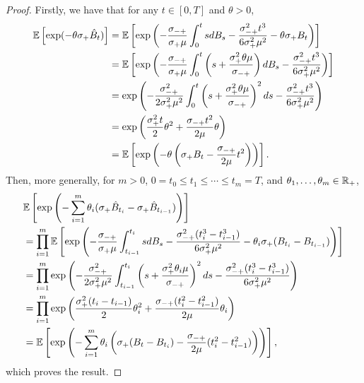  \begin{proof}
 Firstly, we have that for any $t\in [0,T]$ and $\theta>0$,
 \begin{align*} {\mathbb E}\left[\exp(-\theta \sigma_+ \hat{B}_t)\right] &= {\mathbb E} \left[ \exp\left(-\frac{\sigma_{-+}}{\sigma_+ \mu}\int_0^t s dB_s-\frac{\sigma_{-+}^2 t^3}{6\sigma_+^2\mu^2}-\theta\sigma_+ B_t  \right)\right]\\
 &={\mathbb E}\left[\exp \left( -\frac{\sigma_{-+}}{\sigma_+ \mu}\int_0^t \left(s+\frac{\sigma_+^2\theta \mu}{\sigma_{-+}}\right) dB_s -\frac{\sigma_{-+}^2 t^3}{6\sigma_+^2\mu^2}\right)\right] \\
 &= \exp\left(-\frac{\sigma_{-+}^2}{2\sigma_+^2 \mu^2}\int_0^t \left(s+\frac{\sigma_+^2\theta \mu}{\sigma_{-+}}\right)^2 ds -\frac{\sigma_{-+}^2 t^3}{6\sigma_+^2\mu^2}\right)\\
 &=\exp\left(\frac{\sigma_+^2 t}{2}\theta^2+\frac{\sigma_{-+} t^2}{2\mu}\theta \right)\\
 &= {\mathbb E} \left[\exp\left(-\theta\left(\sigma_+ B_t - \frac{\sigma_{-+}}{2\mu} t^2\right)\right)\right].
 \end{align*}
 Then, more generally, for $m>0$, $0=t_0\leq t_1\leq \cdots \leq t_m=T$, and $\theta_1, \dots, \theta_m \in {\mathbb R}_+$, 
 \begin{align*}
     &{\mathbb E}\left[\exp\left(-\sum_{i=1}^m \theta_i(\sigma_+\hat{B}_{t_i}-\sigma_+\hat{B}_{t_{i-1}})\right)\right]\\
     &= \prod_{i=1}^m {\mathbb E}\left[\exp\left(-\frac{\sigma_{-+}}{\sigma_+\mu} \int _{t_{i-1}}^{t_i} s dB_s-\frac{\sigma_{-+}^2 (t_i^3-t_{i-1}^3)}{6\sigma_+^2 \mu^2}-\theta_i \sigma_+  (B_{t_i}-B_{t_{i-1}})\right)\right]\\
     &= \prod_{i=1}^m  \exp\left( -\frac{\sigma_{-+}^2}{2\sigma_+^2 \mu^2}\int_{t_{i-1}}^{t_i}\left(s+\frac{\sigma_+^2\theta_i\mu}{\sigma_{-+}}\right)^2 ds - \frac{\sigma_{-+}^2 (t_i^3-t_{i-1}^3)}{6\sigma_+^2 \mu^2} \right)\\
     &=  \prod_{i=1}^m \exp\left(\frac{ \sigma_+^2 (t_i-t_{i-1}) }{2}\theta_i^2+\frac{\sigma_{-+} (t_i^2-t_{i-1}^2)}{2\mu}\theta_i \right)\\
     &={\mathbb E} \left[\exp\left(-\sum_{i=1}^m\theta_i\left(\sigma_+ (B_t-B_{t_i}) - \frac{\sigma_{-+}}{2\mu} (t_i^2-t_{i-1}^2)\right)\right)\right],
 \end{align*}
 which proves the result.
 \end{proof}
